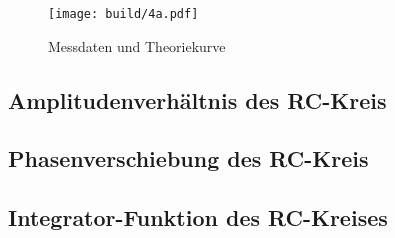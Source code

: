 \begin{figure}
	\centering
	\texttt{[image: build/4a.pdf]}
	\caption{Messdaten und Theoriekurve}
	\label{fig:plot-4a}
\end{figure}

\subsection{Amplitudenverhältnis des RC-Kreis}
\label{sec:4b-auswertung}

\subsection{Phasenverschiebung des RC-Kreis}
\label{sec:4c-auswertung}

\subsection{Integrator-Funktion des RC-Kreises}
\label{sec:4d-auswertung}

